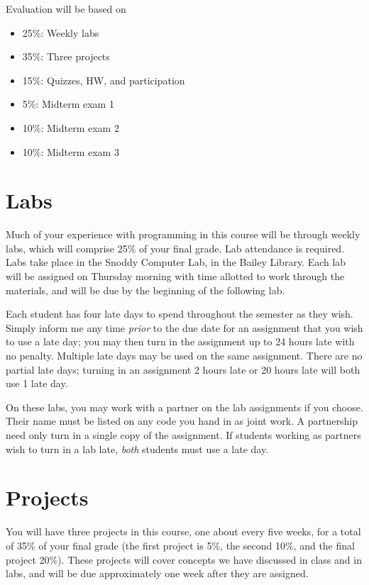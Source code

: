 \documentclass{article}
\begin{document}
Evaluation will be based on
\begin{itemize}
\item 25\%: Weekly labs
\item 35\%: Three projects
\item 15\%: Quizzes, HW, and participation
\item 5\%: Midterm exam 1
\item 10\%: Midterm exam 2
\item 10\%: Midterm exam 3
\end{itemize}

\section*{Labs}

Much of your experience with programming in this course will be
through weekly labs, which will comprise 25\% of your final grade. Lab
attendance is required. Labs take place in the Snoddy Computer Lab, in
the Bailey Library.  Each lab will be assigned on Thursday morning
with time allotted to work through the materials, and will be due by
the beginning of the following lab.

Each student has four late days to spend throughout the semester as
they wish.  Simply inform me any time \emph{prior} to the due date for an
assignment that you wish to use a late day; you may then turn in the
assignment up to 24 hours late with no penalty.  Multiple late days
may be used on the same assignment.  There are no partial late days;
turning in an assignment 2 hours late or 20 hours late will both use 1
late day.

On these labs, you may work with a partner on the lab assignments if
you choose. Their name must be listed on any code you hand in as joint
work.  A partnership need only turn in a single copy of the
assignment.  If students working as partners wish to turn in a lab
late, \emph{both} students must use a late day.

\section*{Projects}

You will have three projects in this course, one about every five
weeks, for a total of 35\% of your final grade (the first project is
5\%, the second 10\%, and the final project 20\%). These projects will
cover concepts we have discussed in class and in labs, and will be due
approximately one week after they are assigned.
\end{document}
